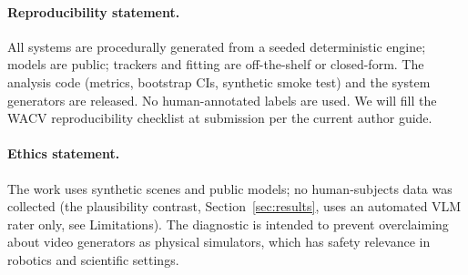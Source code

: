 \documentclass[10pt,twocolumn,letterpaper]{article}
\begin{document}
\paragraph{Reproducibility statement.}
All systems are procedurally generated from a seeded deterministic engine;
models are public; trackers and fitting are off-the-shelf or closed-form. The
analysis code (metrics, bootstrap CIs, synthetic smoke test) and the system
generators are released. No human-annotated labels are used. We will fill the
WACV reproducibility checklist at submission per the current author guide.

\paragraph{Ethics statement.}
The work uses synthetic scenes and public models; no human-subjects data was
collected (the plausibility contrast, Section~\ref{sec:results}, uses an
automated VLM rater only, see Limitations). The diagnostic is intended to
prevent overclaiming about video generators as physical simulators, which
has safety relevance in robotics and scientific settings.
\end{document}
